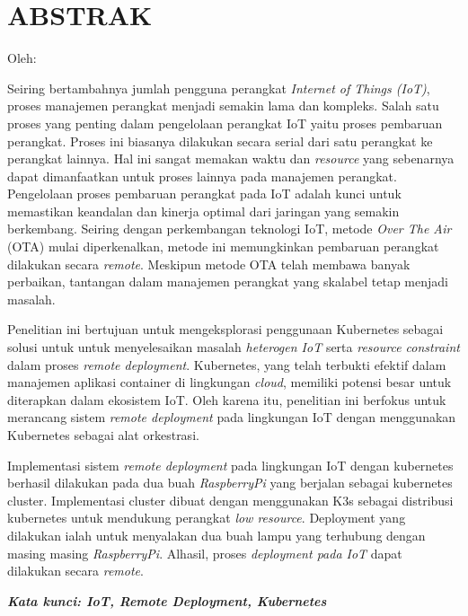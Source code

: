 \clearpage
\chapter*{ABSTRAK}
\begin{center}
  \center
  \begin{singlespace}
    \large\bfseries\MakeUppercase{\thetitle}
    
    \normalfont\normalsize
    Oleh:
    
    \bfseries \theauthor
  \end{singlespace}
\end{center}

\begin{singlespace}
  \small
  Seiring bertambahnya jumlah pengguna perangkat \textit{Internet of Things (IoT)}, proses manajemen perangkat menjadi semakin lama dan kompleks. Salah satu proses yang penting dalam pengelolaan perangkat IoT yaitu proses pembaruan perangkat. Proses ini biasanya dilakukan secara serial dari satu perangkat ke perangkat lainnya. Hal ini sangat memakan waktu dan \textit{resource} yang sebenarnya dapat dimanfaatkan untuk proses lainnya pada manajemen perangkat. Pengelolaan proses pembaruan perangkat pada IoT adalah kunci untuk memastikan keandalan dan kinerja optimal dari jaringan yang semakin berkembang. Seiring dengan perkembangan teknologi IoT, metode \textit{Over The Air} (OTA) mulai diperkenalkan, metode ini memungkinkan pembaruan perangkat dilakukan secara \textit{remote}. Meskipun metode OTA telah membawa banyak perbaikan, tantangan dalam manajemen perangkat yang skalabel tetap menjadi masalah.
  
  Penelitian ini bertujuan untuk mengeksplorasi penggunaan Kubernetes sebagai solusi untuk untuk menyelesaikan masalah \textit{heterogen IoT} serta \textit{resource constraint} dalam proses \textit{remote deployment}. Kubernetes, yang telah terbukti efektif dalam manajemen aplikasi container di lingkungan \textit{cloud}, memiliki potensi besar untuk diterapkan dalam ekosistem IoT. Oleh karena itu, penelitian ini berfokus untuk merancang sistem \textit{remote deployment} pada lingkungan IoT dengan menggunakan Kubernetes sebagai alat orkestrasi.
  
  Implementasi sistem \textit{remote deployment} pada lingkungan IoT dengan kubernetes berhasil dilakukan pada dua buah \textit{RaspberryPi} yang berjalan sebagai kubernetes cluster.  Implementasi cluster dibuat dengan menggunakan K3s sebagai distribusi kubernetes untuk mendukung perangkat \textit{low resource}. Deployment yang dilakukan ialah untuk menyalakan dua buah lampu yang terhubung dengan masing masing \textit{RaspberryPi}. Alhasil, proses \textit{deployment pada IoT} dapat dilakukan secara \textit{remote}.
  
  \textbf{\textit{Kata kunci: IoT, Remote Deployment, Kubernetes }}
  
\end{singlespace}
\clearpage